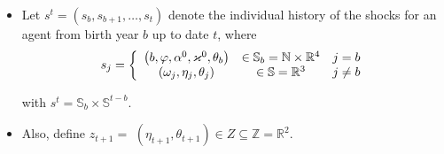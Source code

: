 \documentclass[notes=show]{beamer}
\begin{document}
\begin{frame}%


\begin{itemize}
\item Let $s^{t}=\left( s_{b},s_{b+1},\ldots ,s_{t}\right) $ denote the
individual history of the shocks for an agent from birth year $b$ up to date 
$t$, where%
\begin{equation}
s_{j}=\left\{ 
\begin{array}{ccc}
\left( b,\varphi ,\alpha ^{0},\varkappa ^{0},\theta _{b}\right) & \in {%
\mathbb{S}}_b=%
\mathbb{N}
\times 
\mathbb{R}
^{4} & j=b \\ 
\left( \omega _{j},\eta _{j},\theta _{j}\right) & \in \mathbb{S}=%
\mathbb{R}
^{3} & j\neq b%
\end{array}%
\right.
\end{equation}

with $s^{t}={\mathbb{S}}_{b}\times \mathbb{S}^{t-b}$.

\item Also, define $z_{t+1}=$ $\left( \eta _{t+1},\theta _{t+1}\right) \in
Z\subseteq 
\mathbb{Z}
=%
\mathbb{R}
^{2}$.
\end{itemize}

\transboxout%
\end{frame}%

\bigskip
\end{document}

